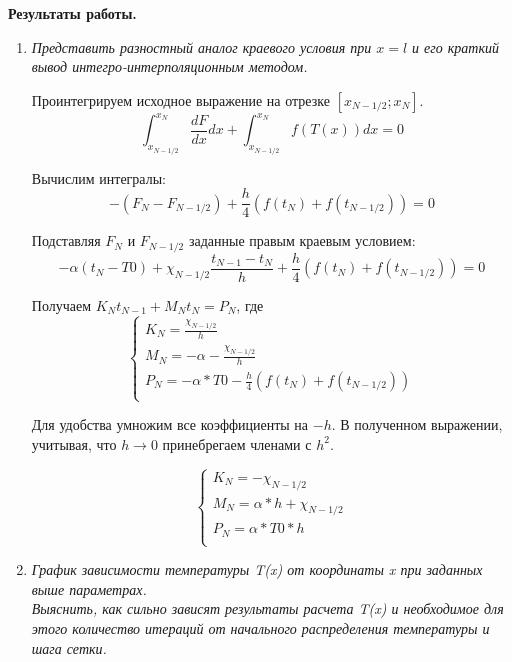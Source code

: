 \textbf{Результаты работы.}
\begin{enumerate}
	\item \textit{Представить разностный аналог краевого условия при $x = l$
	и его краткий вывод интегро-интерполяционным методом.}
	
	Проинтегрируем исходное выражение на отрезке $[x_{N-1/2}; x_{N}]$.
	\begin{equation*}
		\int_{x_{N-1/2}}^{x_{N}} \frac{dF}{dx}dx + \int_{x_{N-1/2}}^{x_{N}} f(T(x))dx = 0
	\end{equation*}
	
	Вычислим интегралы:
	\begin{equation*}
		-(F_{N} - F_{N-1/2}) + \frac{h}{4}(f(t_{N}) + f(t_{N-1/2})) = 0
	\end{equation*}
	
	Подставляя $F_N$ и $F_{N-1/2}$ заданные правым краевым условием:
	\begin{equation*}
		-\alpha(t_N - T0) + \chi_{N-1/2} \dfrac{t_{N-1} - t_{N}}{h}
		+ \frac{h}{4}(f(t_{N}) + f(t_{N-1/2})) = 0
	\end{equation*}
	
	Получаем $K_N t_{N-1} + M_N t_{N} = P_N$, где 
	\begin{equation*}
		\begin{cases}
			K_N = \frac{\chi_{N-1/2}}{h} \\ 
			M_N = -\alpha - \frac{\chi_{N-1/2}}{h}\\
			P_N = -\alpha*T0 - \frac{h}{4}(f(t_{N}) + f(t_{N-1/2}))\\
		\end{cases}
	\end{equation*}

	Для удобства умножим все коэффициенты на $-h$. В полученном выражении, учитывая, что $h \rightarrow 0$ принебрегаем членами с $h^2$.
	
	\begin{equation*}
		\begin{cases}
			K_N = - \chi_{N-1/2} \\ 
			M_N = \alpha*h + \chi_{N-1/2}\\
			P_N = \alpha*T0*h\\
		\end{cases}
	\end{equation*}
	
	\item \textit{График зависимости температуры T(x) от координаты x при заданных выше параметрах.\\
	Выяснить, как сильно зависят результаты расчета T(x) и необходимое для этого количество итераций от начального распределения температуры и шага сетки.}
	

\end{enumerate}
